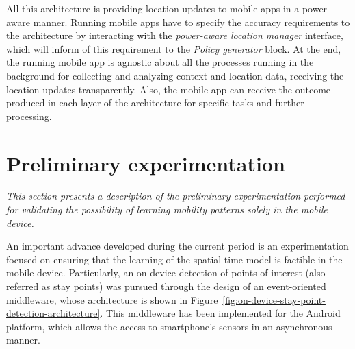 \documentclass[ENG,PhD]{cinvestav}
\begin{document}
All this architecture is providing location updates to mobile apps in a power-aware manner.
Running mobile apps have to specify the accuracy requirements to the architecture by interacting with the \emph{power-aware location manager} interface, which will inform of this requirement to the \emph{Policy generator} block.
At the end, the running mobile app is agnostic about all the processes running in the background for collecting and analyzing context and location data, receiving the location updates transparently.
Also, the mobile app can receive the outcome produced in each layer of the architecture for specific tasks and further processing.


\section{Preliminary experimentation}
\label{sec:preliminary-experimentation}
\emph{This section presents a description of the preliminary experimentation performed for validating the possibility of learning mobility patterns solely in the mobile device.}


An important advance developed during the current period is an experimentation focused on ensuring that the learning of the spatial time model is factible in the mobile device.
Particularly, an on-device detection of points of interest (also referred as stay points) was pursued through the design of an event-oriented middleware, whose architecture is shown in Figure~\ref{fig:on-device-stay-point-detection-architecture}.
This middleware has been implemented for the Android platform, which allows the access to smartphone's sensors in an asynchronous manner.
\end{document}
